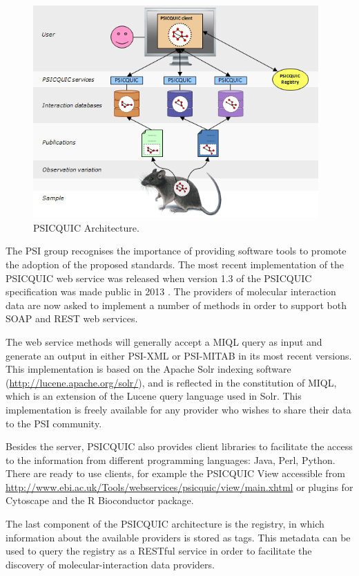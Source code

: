 \begin{figure}  
\centering
\includegraphics[width=4.3in]{figures/psicquic.png}
\caption[PSICQUIC Architecture.]{PSICQUIC Architecture.
\label{fig:psicquic}}
\end{figure}

The PSI group recognises the importance of providing software tools to promote the adoption of the proposed standards. The most recent implementation of the PSICQUIC web service was released when version 1.3 of the PSICQUIC specification was made public in 2013 \cite{DEL2013}. The providers of molecular interaction data are now asked to implement a number of methods in order to support both SOAP and REST web services. 

The web service methods will generally accept a MIQL query as input and generate an output in either PSI-XML or PSI-MITAB in its most recent versions. This implementation is based on the Apache Solr indexing software (\url{http://lucene.apache.org/solr/}), and is reflected in the constitution of MIQL, which is an extension of the Lucene query language used in Solr. This implementation is freely available for any provider who wishes to share their data to the PSI community.

Besides the server, PSICQUIC also provides client libraries to facilitate the access to the information from different programming languages: Java, Perl, Python. There are ready to use clients, for example the PSICQUIC View accessible from \url{http://www.ebi.ac.uk/Tools/webservices/psicquic/view/main.xhtml} or plugins for Cytoscape and the R Bioconductor package.

The last component of the PSICQUIC architecture is the registry, in which information about the available providers is stored as tags. This metadata can be used to query the registry as a RESTful service in order to facilitate the discovery of molecular-interaction data providers.

